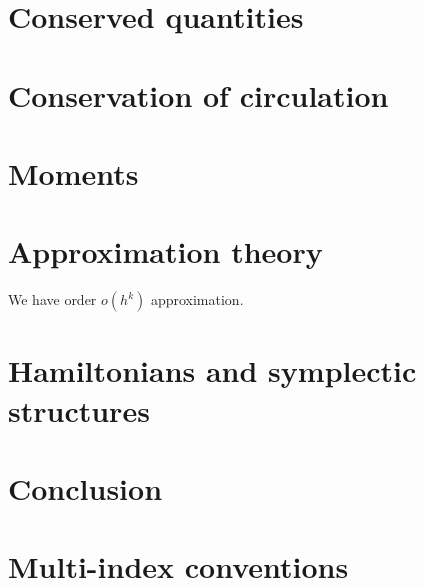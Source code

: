 \documentclass[12pt]{amsart}
\begin{document}
\section{Conserved quantities}
\label{sec:conserved_quantities}


\section{Conservation of circulation}
\label{sec:circulation}


\section{Moments}
\label{sec:moments}


\section{Approximation theory}
\label{sec:approximation_theory}

We have order $o(h^k)$ approximation.

\section{Hamiltonians and symplectic structures}
\label{sec:symplectic}


\section{Conclusion}

\appendix
\section{Multi-index conventions}
\label{app:multi}



\end{document}
